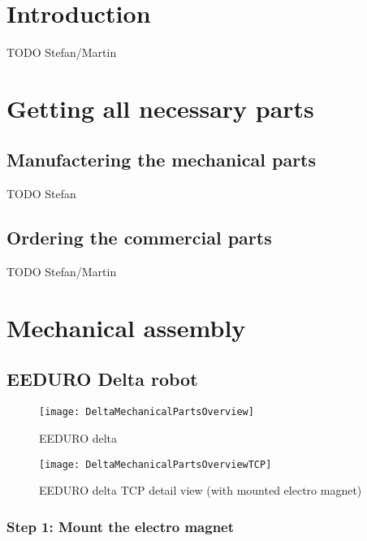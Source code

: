 \newpage

\chapter{Introduction}
TODO Stefan/Martin

\chapter{Getting all necessary parts}

\section{Manufactering the mechanical parts}
TODO Stefan

\section{Ordering the commercial parts}
TODO Stefan/Martin

\chapter{Mechanical assembly}

\section{EEDURO Delta robot}

\begin{figure}[htbp]
	\centering
	\texttt{[image: DeltaMechanicalPartsOverview]}
	\caption{EEDURO delta}
	\label{fig:DeltaMechanicalPartsOverview}
\end{figure}

\begin{figure}[htbp]
	\centering
	\texttt{[image: DeltaMechanicalPartsOverviewTCP]}
	\caption{EEDURO delta TCP detail view (with mounted electro magnet)}
	\label{fig:DeltaMechanicalPartsOverviewTCP}
\end{figure}

\subsection*{Step 1: Mount the electro magnet}

